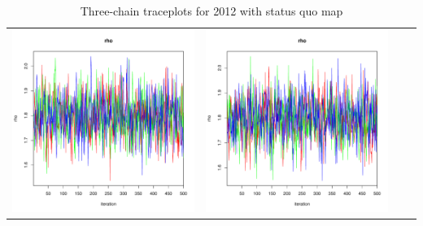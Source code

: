 \documentclass[letter,12pt]{article}
\begin{document}
\begin{table}
\begin{tabular}{cccc}
                        \includegraphics[width=.15\columnwidth]{../graphs/traceplots/2012d0vbar_7.pdf} &
                         \includegraphics[width=.15\columnwidth]{../graphs/traceplots/2012d0wbar_7.pdf} \\
\end{tabular}
\caption{Three-chain traceplots for 2012 with status quo map}
\end{table}
\end{document}
